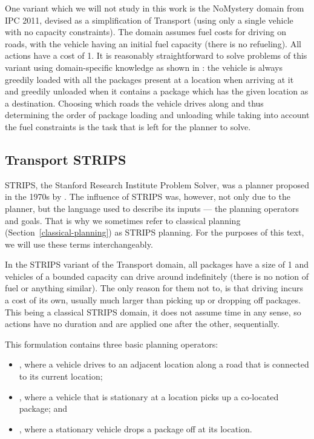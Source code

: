 One variant which we will not study
in this work is the NoMystery domain from IPC 2011,
devised as a simplification of Transport (using only a single
vehicle with no capacity constraints).
The domain assumes
fuel costs for driving on roads, with the vehicle
having an initial fuel capacity (there is no refueling).
All actions have a cost of 1.
It is reasonably straightforward to solve problems of this variant using domain-specific knowledge as shown in \citet{Bartak2016}: the vehicle is always greedily loaded
with all the packages present at a location when arriving at it and
greedily unloaded when it contains a package which has the given location as a destination. Choosing which roads the vehicle drives
along and thus determining
the order of package loading and unloading 
while taking into account the fuel constraints is
the task that is left for the planner to solve.

\subsection{Transport STRIPS}\label{transport-strips}

STRIPS, the Stanford Research Institute Problem Solver,
was a planner proposed in the 1970s by \citet{Fikes1971}.
The influence of STRIPS was, however, not only due to the planner,
but the language used to describe its inputs --- the planning operators and goals.
That is why we sometimes refer to classical planning (Section~\ref{classical-planning})
as STRIPS planning. For the purposes of this text, we will use these terms interchangeably.

In the STRIPS variant of the Transport domain,
all packages have a size of 1 and vehicles of a bounded capacity can drive around indefinitely
(there is no notion of fuel or anything similar). The only reason for them not to, is that
driving incurs a cost of its own, usually much larger than picking up or dropping off packages.
This being a classical STRIPS domain,
it does not assume time in any sense,
so actions have no duration and are applied one after the other, sequentially.

This formulation contains three basic planning operators:

\begin{itemize}
\item \drive{}, where a vehicle drives to an adjacent location
along a road that is connected to its current location;
\item \pickup{}, where a vehicle that is stationary at a location picks up a co-located package; and
\item \drop{}, where a stationary vehicle drops a package off at its location.
\end{itemize}

